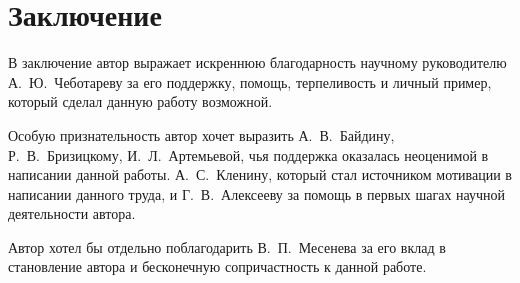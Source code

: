 \chapter*{Заключение}                       %





В заключение автор выражает искреннюю благодарность научному руководителю
А.\ Ю.\ Чеботареву за его поддержку,
помощь, терпеливость и личный пример,
который сделал данную работу возможной.

Особую признательность автор хочет выразить А.\ В.\ Байдину,
Р.\ В.\ Бризицкому, И.\ Л.\ Артемьевой, чья поддержка оказалась
неоценимой в написании данной работы.
А.\ С.\ Кленину, который стал источником мотивации в написании данного труда,
и Г.\ В.\ Алексееву за помощь в первых шагах научной деятельности автора.

Автор хотел бы отдельно поблагодарить В.\ П.\ Месенева
за его вклад в становление автора
и бесконечную сопричастность к данной работе.
